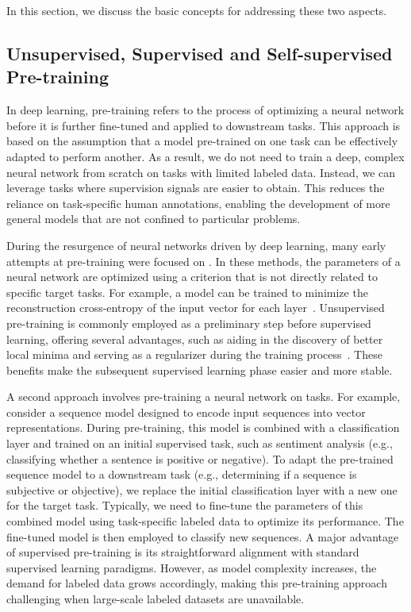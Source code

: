 In this section, we discuss the basic concepts for addressing these two aspects.

\subsection{Unsupervised, Supervised and Self-supervised Pre-training}

\noindent In deep learning, pre-training refers to the process of optimizing a neural network before it is further fine-tuned and applied to downstream tasks. This approach is based on the assumption that a model pre-trained on one task can be effectively adapted to perform another. As a result, we do not need to train a deep, complex neural network from scratch on tasks with limited labeled data. Instead, we can leverage tasks where supervision signals are easier to obtain. This reduces the reliance on task-specific human annotations, enabling the development of more general models that are not confined to particular problems.

During the resurgence of neural networks driven by deep learning, many early attempts at pre-training were focused on . In these methods, the parameters of a neural network are optimized using a criterion that is not directly related to specific target tasks. For example, a model can be trained to minimize the reconstruction cross-entropy of the input vector for each layer~\cite{bengio-etal:2006greedy}. Unsupervised pre-training is commonly employed as a preliminary step before supervised learning, offering several advantages, such as aiding in the discovery of better local minima and serving as a regularizer during the training process~\cite{erhan-etal:2010does}. These benefits make the subsequent supervised learning phase easier and more stable.

A second approach involves pre-training a neural network on  tasks. For example, consider a sequence model designed to encode input sequences into vector representations. During pre-training, this model is combined with a classification layer and trained on an initial supervised task, such as sentiment analysis (e.g., classifying whether a sentence is positive or negative). To adapt the pre-trained sequence model to a downstream task (e.g., determining if a sequence is subjective or objective), we replace the initial classification layer with a new one for the target task. Typically, we need to fine-tune the parameters of this combined model using task-specific labeled data to optimize its performance. The fine-tuned model is then employed to classify new sequences. A major advantage of supervised pre-training is its straightforward alignment with standard supervised learning paradigms. However, as model complexity increases, the demand for labeled data grows accordingly, making this pre-training approach challenging when large-scale labeled datasets are unavailable.

